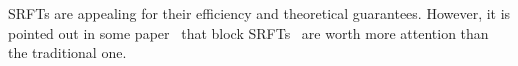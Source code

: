 \documentclass{article}
\begin{document}
SRFTs are appealing for their efficiency and theoretical guarantees\cite{WOOLFE2008335}.
However, it is pointed out in some paper~\cite{murray2023randomizednumericallinearalgebra} that block SRFTs~\cite{balabanov2022blocksubsampledrandomizedhadamard} are worth more attention than the traditional one. 


\end{document}
